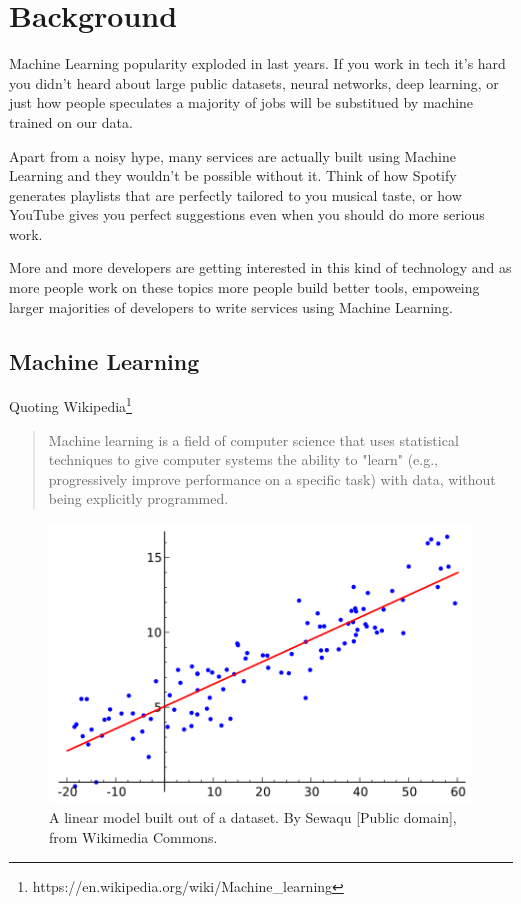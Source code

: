 \chapter{Background}
\label{ch:background}

Machine Learning popularity exploded in last years. If you work in tech
it's hard you didn't heard about large public datasets, neural
networks, deep learning, or just how people speculates a majority of
jobs will be substitued by machine trained on our data.

Apart from a noisy hype, many services are actually built using Machine
Learning and they wouldn't be possible without it. Think of how Spotify
generates playlists that are perfectly tailored to you musical taste,
or how YouTube gives you perfect suggestions even when you should do
more serious work.

More and more developers are getting interested in this kind of
technology and as more people work on these topics more people build
better tools, empoweing larger majorities of developers to write
services using Machine Learning.

\section{Machine Learning}

Quoting
Wikipedia\footnote{https://en.wikipedia.org/wiki/Machine\_learning}

\begin{quote}
Machine learning is a field of computer science that uses statistical
techniques to give computer systems the ability to "learn" (e.g.,
progressively improve performance on a specific task) with data,
without being explicitly programmed.
\end{quote}

\begin{figure}
  \centering
  \includegraphics[width=0.5\linewidth]{wikipedia-linear-regression.png}
  \caption{A linear model built out of a dataset. By Sewaqu [Public
      domain], from Wikimedia Commons.}
\end{figure}

